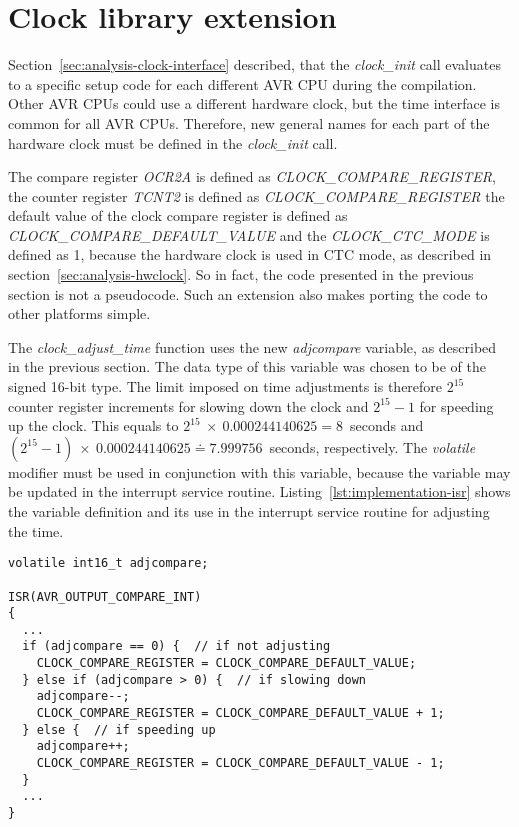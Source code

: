 
\section{Clock library extension}\label{sec:implementation-clock}
Section~\ref{sec:analysis-clock-interface} described, that
the {\it{clock\_init}} call evaluates to a specific setup code
for each different AVR CPU during the compilation.
Other AVR CPUs could use a different hardware clock,
but the time interface is common for all AVR CPUs.
Therefore, new general names for each part of the hardware clock
must be defined in the {\it{clock\_init}} call.

The compare register {\it{OCR2A}} is defined as {\it{CLOCK\_COMPARE\_REGISTER}},
the counter register {\it{TCNT2}} is defined as {\it{CLOCK\_COMPARE\_REGISTER}}
the default value of the clock compare register is defined as {\it{CLOCK\_COMPARE\_DEFAULT\_VALUE}}
and the {\it{CLOCK\_CTC\_MODE}} is defined as 1, because the hardware clock is used in CTC mode,
as described in section~\ref{sec:analysis-hwclock}.
So in fact, the code presented in the previous section is not a pseudocode.
Such an extension also makes porting the code to other platforms simple.

The {\it{clock\_adjust\_time}} function uses the new {\it{adjcompare}} variable,
as described in the previous section.
The data type of this variable was chosen to be of the signed 16-bit type.
The limit imposed on time adjustments is therefore $2^{15}$ counter register increments %
for slowing down the clock and $2^{15}-1$ for speeding up the clock.
This equals to $2^{15}~\times~0.000244140625 = 8$~seconds
and $(2^{15} - 1)~\times~0.000244140625 \doteq 7.999756$~seconds, respectively.
The {\it{volatile}} modifier must be used in conjunction with this variable,
because the variable may be updated in the interrupt service routine.
Listing~\ref{lst:implementation-isr} shows the variable definition
and its use in the interrupt service routine for adjusting the time.
\begin{lstlisting}[caption={Pseudocode of adjustments in interrupt service routine},label={lst:implementation-isr}]
volatile int16_t adjcompare;

ISR(AVR_OUTPUT_COMPARE_INT)
{
  ...
  if (adjcompare == 0) {  // if not adjusting
    CLOCK_COMPARE_REGISTER = CLOCK_COMPARE_DEFAULT_VALUE;
  } else if (adjcompare > 0) {  // if slowing down
    adjcompare--;
    CLOCK_COMPARE_REGISTER = CLOCK_COMPARE_DEFAULT_VALUE + 1;
  } else {  // if speeding up
    adjcompare++;
    CLOCK_COMPARE_REGISTER = CLOCK_COMPARE_DEFAULT_VALUE - 1;
  }
  ...
}
\end{lstlisting}
